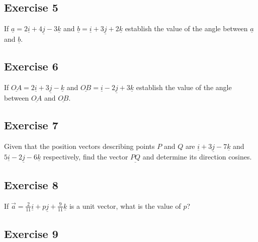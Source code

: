 \documentclass[
  11pt,
  oneside]{book}
\newcommand{\slide}{}
\theoremstyle{definition}
\theoremstyle{definition}
\theoremstyle{definition}
\theoremstyle{definition}
\theoremstyle{remark}
\begin{document}
\slide

\subsection*{Exercise 5}\label{exercise-5-7}

If \(\underline a=2\underline{i}+4\underline{j}-3\underline{k}\) and \(\underline b=\underline{i}+3\underline{j}+2\underline{k}\) establish the value of the angle between \(\underline a\) and \(\underline b\).

\slide

\subsection*{Exercise 6}\label{exercise-6-5}

If \(\underline{OA}=2\underline{i}+3\underline{j}-\underline{k}\) and \(\underline{OB}=\underline{i}-2\underline{j}+3\underline{k}\) establish the value of the angle between \(\underline{OA}\) and \(\underline{OB}\).

\slide

\subsection*{Exercise 7}\label{exercise-7-2}

Given that the position vectors describing points \(P\) and \(Q\) are \(\underline{i}+3\underline{j}-7\underline{k}\) and \(5\underline{i}-2\underline{j}-6\underline{k}\) respectively, find the vector \(\underline{PQ}\) and determine its direction cosines.

\slide

\subsection*{Exercise 8}\label{exercise-8-1}

If \(\vec{a}=\frac2{11}\underline{i}+p\underline{j}+\frac9{11}\underline{k}\) is a unit vector, what is the value of \(p\)?

\slide

\subsection*{Exercise 9}\label{exercise-9-1}
\end{document}
